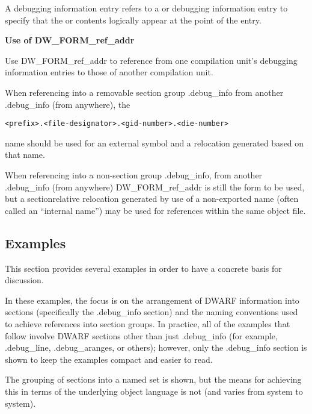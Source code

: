 A  debugging information entry refers
to a 
 or 
 debugging
information entry to specify that the 
 or
 contents logically appear at the point
of the 
 entry.


\textbf{Use of DW\_FORM\_ref\_addr}

Use 
DW\_FORM\_ref\_addr to reference from one compilation
unit's debugging information entries to those of another
compilation unit.

When referencing into a removable section group .debug\_info
from another .debug\_info (from anywhere), the
\begin{alltt}
<prefix>.<file-designator>.<gid-number>.<die-number>
\end{alltt}
name should be used for an external symbol and a relocation
generated based on that name.

When referencing into a non-section group .debug\_info,
from another .debug\_info (from anywhere) 
DW\_FORM\_ref\_addr is
still the form to be used, but a section\dash relative relocation
generated by use of a non-exported name (often called an
``internal name'') may be used for references within the
same object file.

\subsection{Examples}
\label{app:examples}

This section provides several examples in order to have a
concrete basis for discussion.

In these examples, the focus is on the arrangement of DWARF
information into sections (specifically the .debug\_info
section) and the naming conventions used to achieve references
into section groups. In practice, all of the examples that
follow involve DWARF sections other than just .debug\_info
(for example, .debug\_line, .debug\_aranges, or others);
however, only the .debug\_info section is shown to keep the
examples compact and easier to read.

The grouping of sections into a named set is shown, but the means for achieving this in terms of
the underlying object language is not (and varies from system to system).

